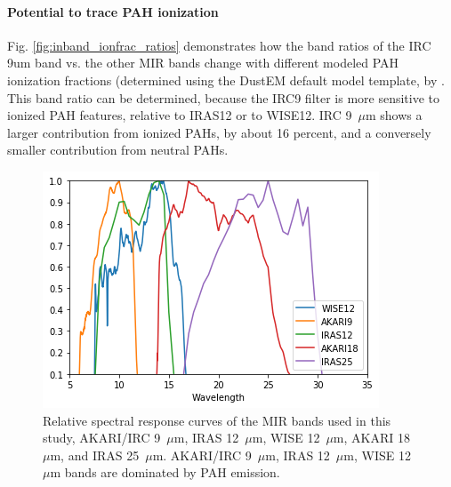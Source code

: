           \paragraph{Potential to trace PAH ionization}
            Fig. \ref{fig:inband_ionfrac_ratios} demonstrates how the band ratios of the IRC 9um band vs. the other MIR bands change with different modeled PAH ionization fractions (determined using the DustEM default model template, by \cite{dustem11}. This band ratio can be determined, because the IRC9 filter is more sensitive to ionized PAH features, relative to IRAS12 or to WISE12.
           IRC 9~$\mu$m shows a larger contribution from ionized PAHs, by about 16 percent, and a conversely smaller contribution from neutral PAHs.

       \begin{figure}
         \label{fig:relSpectralResponse_MIR}
         \centering
         \includegraphics[width=\textwidth]{../Plots/RelSpectralResponse_MIR.png}
         \caption{Relative spectral response curves of the MIR bands used in this study, AKARI/IRC 9~$\mu$m, IRAS 12~$\mu$m, WISE 12~$\mu$m, AKARI 18~$\mu$m, and  IRAS 25~$\mu$m. AKARI/IRC 9~$\mu$m, IRAS 12~$\mu$m, WISE 12~$\mu$m bands are dominated by PAH emission.}
       \end{figure}


